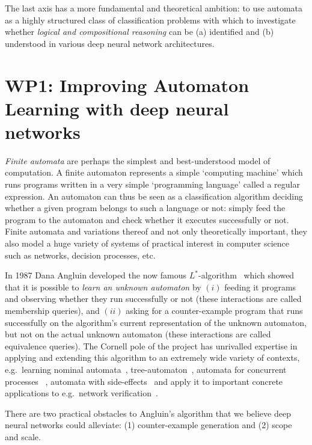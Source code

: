 \documentclass[11pt,a4paper]{article}
\begin{document}
	The last axis has a more fundamental and theoretical ambition: to use automata as a highly structured class of classification problems with which to investigate whether \emph{logical and compositional reasoning} can be (a) identified and (b) understood in various deep neural network architectures.
	
	\section*{WP1: Improving Automaton Learning with deep neural networks}
	\emph{Finite automata} are perhaps the simplest and best-understood model of computation. A finite automaton represents a simple `computing machine' which runs programs written in a very simple `programming language' called a regular expression. An automaton can thus be seen as a classification algorithm deciding whether a given program belongs to such a language or not: simply feed the program to the automaton and check whether it executes successfully or not. Finite automata and variations thereof and not only theoretically important, they also model a huge variety of systems of practical interest in computer science such as networks, decision processes, etc.
	
	In 1987 Dana Angluin developed the now famous $L^\ast$-algorithm~\cite{angluin1987learning} which showed that it is possible to \emph{learn an unknown automaton} by $(i)$ feeding it programs and observing whether they run successfully or not (these interactions are called membership queries), and $(ii)$ asking for a counter-example program that runs successfully on the algorithm's current representation of the unknown automaton, but not on the actual unknown automaton (these interactions are called equivalence queries).  The Cornell pole of the project has unrivalled expertise in applying and extending this algorithm to an extremely wide variety of contexts, e.g.\ learning nominal automata~\cite{moerman2017learning}, tree-automaton~\cite{heerdt2022categorical}, automata for concurrent processes ~\cite{van2021learning}, automata with side-effects~\cite{van2020learning} and apply it to important concrete applications to e.g.\ network verification~\cite{ferreira2021prognosis}.
	  
	There are two practical obstacles to Angluin's algorithm that we believe deep neural networks could alleviate: (1) counter-example generation and (2) scope and scale.
	\setcounter{section}{1}
	\setcounter{subsection}{0}
\end{document}
